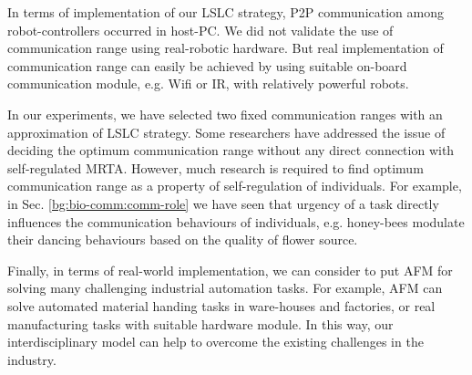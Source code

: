 In terms of implementation of our LSLC strategy, P2P communication among robot-controllers occurred in host-PC. We did not validate the use of communication range  using real-robotic hardware. But real implementation of communication range can easily be achieved by using suitable on-board communication module, e.g. Wifi or IR, with  relatively powerful robots.

In our experiments, we have selected two fixed communication ranges with an approximation of LSLC strategy. Some researchers have addressed the issue of deciding the optimum communication range \cite{Yoshida+2000} without any direct connection with self-regulated MRTA. However, much research is required to find optimum communication range as a property of self-regulation of individuals. For example, in Sec. \ref{bg:bio-comm:comm-role} we have seen that urgency of a task directly influences the communication behaviours of individuals, e.g. honey-bees modulate their dancing behaviours based on the quality of flower source.

Finally, in terms of real-world implementation, we can consider to put AFM for solving many challenging industrial automation tasks. For example, AFM can solve automated material handing tasks in ware-houses and factories, or real manufacturing tasks with suitable hardware module. In this way, our interdisciplinary model can help to overcome the existing challenges in the industry.